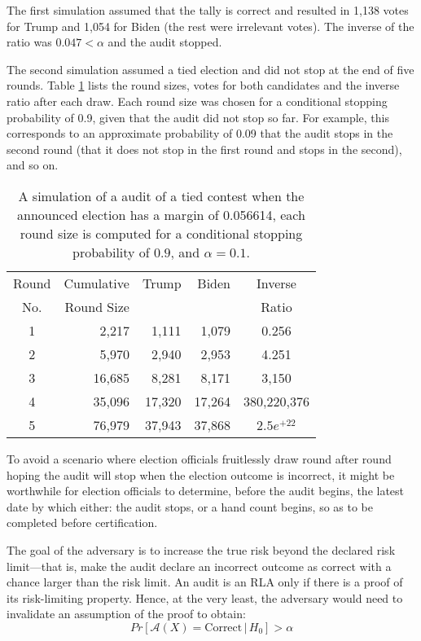 The first simulation assumed that the tally is correct and resulted in 1,138 votes for Trump and 1,054 for Biden (the rest were irrelevant votes). The inverse of the \Providence ratio was $0.047 < \alpha$ and the audit stopped. 

The second simulation assumed a tied election and did not stop at the end of five rounds. 
Table \ref{tab:toy} lists the round sizes, votes for both candidates and the inverse \Providence ratio after each draw. Each round size was chosen for a conditional stopping probability of 0.9, given that the audit did not stop so far. For example, this corresponds to an approximate probability of 0.09 that the audit stops in the second round (that it does not stop in the first round and stops in the second), and so on. 
\begin{table}[h]
\centering
\begin{tabular}{|crrrc|}
\hline
\hline
Round& Cumulative& Trump & Biden & Inverse  \\
 No. & Round Size &  & & Ratio \\
\hline
\hline
1 & 2,217 & 1,111 & 1,079 & 0.256\\
2 & 5,970 & 2,940 & 2,953 & 4.251\\
3 & 16,685 & 8,281 & 8,171 & 3,150 \\
4 & 35,096 & 17,320 & 17,264 & 380,220,376 \\
5 & 76,979 & 37,943 & 37,868 & $2.5e^{+22}$ \\
\hline
\end{tabular}
\caption{A simulation of a \Providence audit of a tied contest when the announced election has a margin of 0.056614, each round size is computed for a conditional stopping probability of $0.9$, and $\alpha=0.1$.}
\label{tab:toy}
\end{table}

To avoid a scenario where election officials fruitlessly draw round after round hoping the audit will stop when the election outcome is incorrect, it might be worthwhile for election officials to determine, before the audit begins, the latest date by which either: the audit stops, or a hand count begins, so as to be completed before certification. 

 The goal of the adversary is to increase the true risk beyond the declared risk limit---that is, make the audit declare an incorrect outcome as correct with a chance larger than the risk limit. An audit is an RLA only if there is a proof of its risk-limiting property. Hence, at the very least, the adversary would need to invalidate an assumption of the proof to obtain:  
$$
Pr[\mathcal{A}(X) 
= \text{Correct} \,|\, H_0] > \alpha
$$

